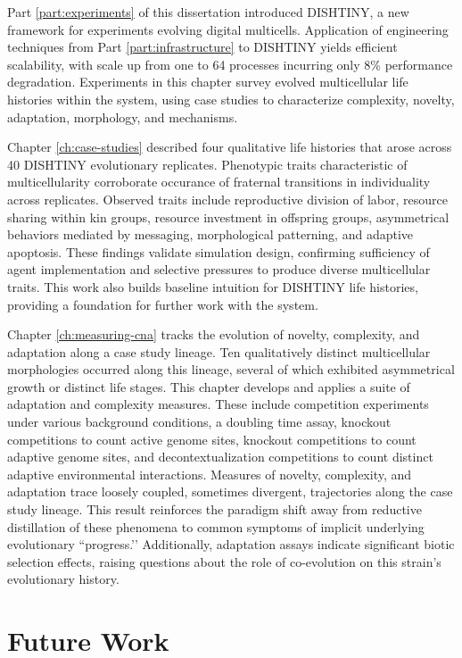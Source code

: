 Part \ref{part:experiments} of this dissertation introduced DISHTINY, a new framework for experiments evolving digital multicells.
Application of engineering techniques from Part \ref{part:infrastructure} to DISHTINY yields efficient scalability, with scale up from one to 64 processes incurring only 8\% performance degradation.
Experiments in this chapter survey evolved multicellular life histories within the system, using case studies to characterize complexity, novelty, adaptation, morphology, and mechanisms.

Chapter \ref{ch:case-studies} described four qualitative life histories that arose across 40 DISHTINY evolutionary replicates.
Phenotypic traits characteristic of multicellularity corroborate occurance of fraternal transitions in individuality across replicates.
Observed traits include reproductive division of labor, resource sharing within kin groups, resource investment in offspring groups, asymmetrical behaviors mediated by messaging, morphological patterning, and adaptive apoptosis.
These findings validate simulation design, confirming sufficiency of agent implementation and selective pressures to produce diverse multicellular traits.
This work also builds baseline intuition for DISHTINY life histories, providing a foundation for further work with the system.

Chapter \ref{ch:measuring-cna} tracks the evolution of novelty, complexity, and adaptation along a case study lineage.
Ten qualitatively distinct multicellular morphologies occurred along this lineage, several of which exhibited asymmetrical growth or distinct life stages.
This chapter develops and applies a suite of adaptation and complexity measures.
These include competition experiments under various background conditions, a doubling time assay, knockout competitions to count active genome sites, knockout competitions to count adaptive genome sites, and decontextualization competitions to count distinct adaptive environmental interactions.
Measures of novelty, complexity, and adaptation trace loosely coupled, sometimes divergent, trajectories along the case study lineage.
This result reinforces the paradigm shift away from reductive distillation of these phenomena to common symptoms of implicit underlying evolutionary ``progress.’’
Additionally, adaptation assays indicate significant biotic selection effects, raising questions about the role of co-evolution on this strain’s evolutionary history.

\section{Future Work}

